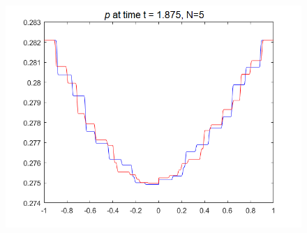 \begin{frame}
\begin{figure}[H]
\begin{minipage}{0.32\textwidth}
			\includegraphics[width=\textwidth]{Bilder_wx/Wavepropa/red=12th_blue=10th_wx=1_leftDr1_rightDr2_Awp12th}
		\end{minipage}
		\hfill
		\begin{minipage}{0.3\textwidth}
		\end{minipage}
	\end{figure}
\end{frame}
